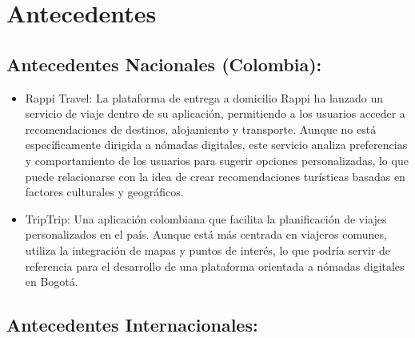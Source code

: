 \section{Antecedentes}

\subsection{Antecedentes Nacionales (Colombia): }

\begin{itemize}
	\item Rappi Travel: La plataforma de entrega a domicilio Rappi ha lanzado un servicio de viaje dentro de su aplicación, permitiendo a los usuarios acceder a recomendaciones de destinos, alojamiento y transporte. Aunque no está específicamente dirigida a nómadas digitales, este servicio analiza preferencias y comportamiento de los usuarios para sugerir opciones personalizadas, lo que puede relacionarse con la idea de crear recomendaciones turísticas basadas en factores culturales y geográficos.

	\item TripTrip: Una aplicación colombiana que facilita la planificación de viajes personalizados en el país. Aunque está más centrada en viajeros comunes, utiliza la integración de mapas y puntos de interés, lo que podría servir de referencia para el desarrollo de una plataforma orientada a nómadas digitales en Bogotá.

\end{itemize}


\subsection{Antecedentes Internacionales:  }

